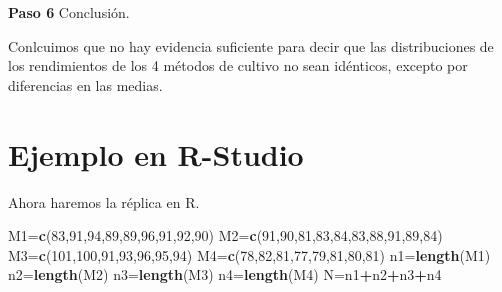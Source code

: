\documentclass[
  a4paper,
  oneside,
  openany]{book}
\newenvironment{Shaded}{\begin{snugshade}}{\end{snugshade}}
\newcommand{\DecValTok}[1]{\textcolor[rgb]{0.00,0.00,0.81}{#1}}
\newcommand{\FunctionTok}[1]{\textcolor[rgb]{0.13,0.29,0.53}{\textbf{#1}}}
\newcommand{\NormalTok}[1]{#1}
\newcommand{\OtherTok}[1]{\textcolor[rgb]{0.56,0.35,0.01}{#1}}
\newcommand{\SpecialCharTok}[1]{\textcolor[rgb]{0.81,0.36,0.00}{\textbf{#1}}}
\begin{document}
\textbf{Paso 6} Conclusión.

Conlcuimos que no hay evidencia suficiente para decir que las distribuciones de los rendimientos de los 4 métodos de cultivo no sean idénticos, excepto por diferencias en las medias.

\hypertarget{ejemplo-en-r-studio-8}{%
\section{Ejemplo en R-Studio}\label{ejemplo-en-r-studio-8}}

Ahora haremos la réplica en R.

\begin{Shaded}
\begin{Highlighting}[]
\NormalTok{M1}\OtherTok{=}\FunctionTok{c}\NormalTok{(}\DecValTok{83}\NormalTok{,}\DecValTok{91}\NormalTok{,}\DecValTok{94}\NormalTok{,}\DecValTok{89}\NormalTok{,}\DecValTok{89}\NormalTok{,}\DecValTok{96}\NormalTok{,}\DecValTok{91}\NormalTok{,}\DecValTok{92}\NormalTok{,}\DecValTok{90}\NormalTok{)}
\NormalTok{M2}\OtherTok{=}\FunctionTok{c}\NormalTok{(}\DecValTok{91}\NormalTok{,}\DecValTok{90}\NormalTok{,}\DecValTok{81}\NormalTok{,}\DecValTok{83}\NormalTok{,}\DecValTok{84}\NormalTok{,}\DecValTok{83}\NormalTok{,}\DecValTok{88}\NormalTok{,}\DecValTok{91}\NormalTok{,}\DecValTok{89}\NormalTok{,}\DecValTok{84}\NormalTok{)}
\NormalTok{M3}\OtherTok{=}\FunctionTok{c}\NormalTok{(}\DecValTok{101}\NormalTok{,}\DecValTok{100}\NormalTok{,}\DecValTok{91}\NormalTok{,}\DecValTok{93}\NormalTok{,}\DecValTok{96}\NormalTok{,}\DecValTok{95}\NormalTok{,}\DecValTok{94}\NormalTok{)}
\NormalTok{M4}\OtherTok{=}\FunctionTok{c}\NormalTok{(}\DecValTok{78}\NormalTok{,}\DecValTok{82}\NormalTok{,}\DecValTok{81}\NormalTok{,}\DecValTok{77}\NormalTok{,}\DecValTok{79}\NormalTok{,}\DecValTok{81}\NormalTok{,}\DecValTok{80}\NormalTok{,}\DecValTok{81}\NormalTok{)}
\NormalTok{n1}\OtherTok{=}\FunctionTok{length}\NormalTok{(M1)}
\NormalTok{n2}\OtherTok{=}\FunctionTok{length}\NormalTok{(M2)}
\NormalTok{n3}\OtherTok{=}\FunctionTok{length}\NormalTok{(M3)}
\NormalTok{n4}\OtherTok{=}\FunctionTok{length}\NormalTok{(M4)}
\NormalTok{N}\OtherTok{=}\NormalTok{n1}\SpecialCharTok{+}\NormalTok{n2}\SpecialCharTok{+}\NormalTok{n3}\SpecialCharTok{+}\NormalTok{n4}


\end{Highlighting}
\end{Shaded}
\end{document}
